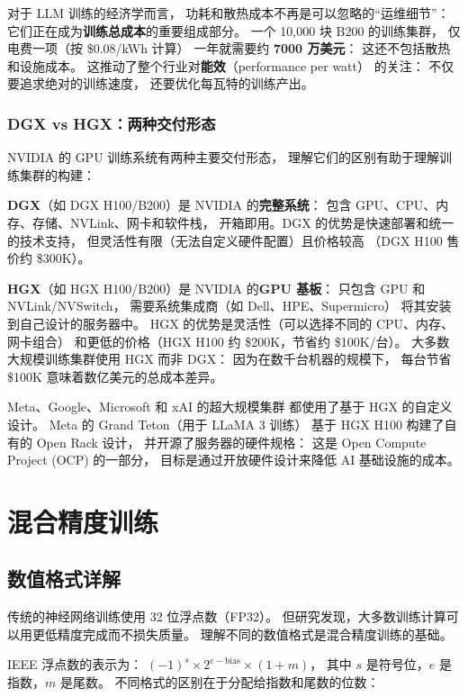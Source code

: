 对于 LLM 训练的经济学而言，
功耗和散热成本不再是可以忽略的“运维细节”：
它们正在成为\textbf{训练总成本}的重要组成部分。
一个 10,000 块 B200 的训练集群，
仅电费一项（按 \$0.08/kWh 计算）
一年就需要约 \textbf{7000 万美元}：
这还不包括散热和设施成本。
这推动了整个行业对\textbf{能效}（performance per watt）
的关注：
不仅要追求绝对的训练速度，
还要优化每瓦特的训练产出。

\subsubsection{DGX vs HGX：两种交付形态}

NVIDIA 的 GPU 训练系统有两种主要交付形态，
理解它们的区别有助于理解训练集群的构建：

\textbf{DGX}（如 DGX H100/B200）是 NVIDIA 的\textbf{完整系统}：
包含 GPU、CPU、内存、存储、NVLink、网卡和软件栈，
开箱即用。DGX 的优势是快速部署和统一的技术支持，
但灵活性有限（无法自定义硬件配置）且价格较高
（DGX H100 售价约 \$300K）。

\textbf{HGX}（如 HGX H100/B200）是 NVIDIA 的\textbf{GPU 基板}：
只包含 GPU 和 NVLink/NVSwitch，
需要系统集成商（如 Dell、HPE、Supermicro）
将其安装到自己设计的服务器中。
HGX 的优势是灵活性（可以选择不同的 CPU、内存、网卡组合）
和更低的价格（HGX H100 约 \$200K，节省约 \$100K/台）。
大多数大规模训练集群使用 HGX 而非 DGX：
因为在数千台机器的规模下，
每台节省 \$100K 意味着数亿美元的总成本差异。

Meta、Google、Microsoft 和 xAI 的超大规模集群
都使用了基于 HGX 的自定义设计。
Meta 的 Grand Teton（用于 LLaMA 3 训练）
基于 HGX H100 构建了自有的 Open Rack 设计，
并开源了服务器的硬件规格：
这是 Open Compute Project (OCP) 的一部分，
目标是通过开放硬件设计来降低 AI 基础设施的成本。

\section{混合精度训练}

\subsection{数值格式详解}

传统的神经网络训练使用 32 位浮点数（FP32）。
但研究发现，大多数训练计算可以用更低精度完成而不损失质量。
理解不同的数值格式是混合精度训练的基础。

IEEE 浮点数的表示为：
$(-1)^s \times 2^{e - \mathrm{bias}} \times (1 + m)$，
其中 $s$ 是符号位，$e$ 是指数，$m$ 是尾数。
不同格式的区别在于分配给指数和尾数的位数：

